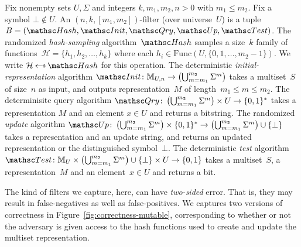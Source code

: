 Fix nonempty sets $U,\Sigma$ and integers $k,m_1,m_2,n>0$ with $m_1 \leq m_2$.  Fix a symbol $\bot \not\in U$.  An $(n,k,[m_1,m_2])$-filter (over universe~$U$) is a tuple  $B=(\Hash,\Init,\Qry,\Update, \Test)$.   
%
The randomized \emph{hash-sampling} algorithm~$\Hash$ samples a size~$k$ family of functions~$\mathcal{H}=\{h_1,h_2,\ldots,h_k\}$ where each $h_i \in  \mathrm{Func}(U,\{0,1,\ldots,m_2-1\})$.  We write $\mathcal{H} \getsr \Hash$ for this operation. 
%
The deterministic \emph{initial-representation} algorithm $\Init\colon \multiset{U,n} \rightarrow \left(\bigcup_{m=m_1}^{m_2}\Sigma^m\right)$ takes a multiset~$S$ of size~$n$ as input, and outputs representation~$M$ of length~$m_1 \leq m \leq m_2$.
%
The determinisitc query algorithm $\Qry\colon \left(\bigcup_{m=m_1}^{m_2}\Sigma^m \right)\times U \rightarrow \bits^*$ takes a representation $M$ and an element $x \in U$ and returns a bitstring.  
%
The randomized \emph{update} algorithm $\Update\colon \left(\bigcup_{m=m_1}^{m_2}\Sigma^m \right)\times \bits^* \rightarrow \left(\bigcup_{m=m_1}^{m_2}\Sigma^m \right) \cup \{\bot\}$ takes a representation and an update string, and returns an updated representation or the distinguished symbol~$\bot$.  
%
The deterministic \emph{test} algorithm $\Test \colon \multiset{U}\times \left(\bigcup_{m=m_1}^{m_2}\Sigma^m \right)\cup\{\bot\} \times U \rightarrow \bits$ takes a multiset~$S$, a representation~$M$ and an element~$x \in U$ and returns a bit.
%

 The kind of filters we capture, here, can have \emph{two-sided} error.  That is, they may result in false-negatives as well as false-positives.  We captures two versions of correctness in Figure~\ref{fig:correctness-mutable}, corresponding to whether or not the adversary is given access to the hash functions used to create and update the multiset representation.

